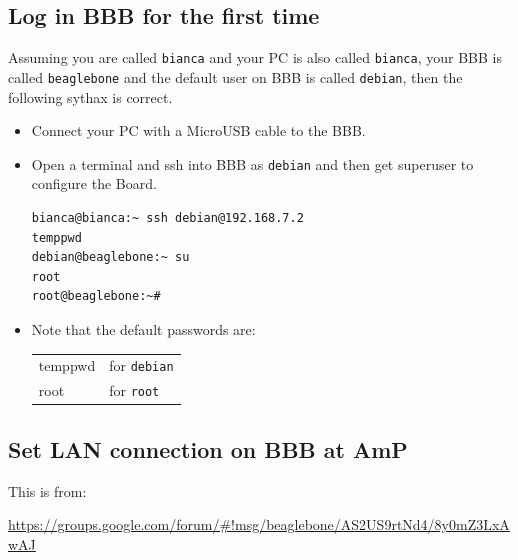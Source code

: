 \documentclass[
	fontsize=10pt
	paper=a4
]{scrartcl}
\begin{document}
\subsection{Log in BBB for the first time}

Assuming you are called \texttt{bianca} and your PC is also called \texttt{bianca},
your BBB is called \texttt{beaglebone} and the default user on BBB is called \texttt{debian}, then the following sythax is correct.

\begin{itemize}
\item Connect your PC with a MicroUSB cable to the BBB.

\item Open a terminal and ssh into BBB as \texttt{debian} and then get superuser to configure the Board.
\begin{lstlisting}
bianca@bianca:~ ssh debian@192.168.7.2
temppwd
debian@beaglebone:~ su
root
root@beaglebone:~#
\end{lstlisting}

\item Note that the default passwords are:
\begin{tabular}{l|l}
temppwd & for \texttt{debian} \\
root & for \texttt{root}
\end{tabular}

\end{itemize}




\subsection{Set LAN connection on BBB at AmP}

This is from:

\url{https://groups.google.com/forum/#!msg/beaglebone/AS2US9rtNd4/8y0mZ3LxAwAJ}
\end{document}
